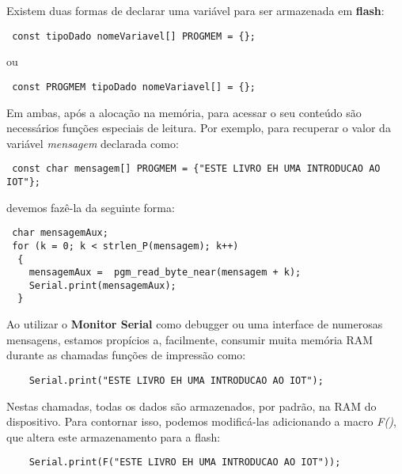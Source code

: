\documentclass[
	11pt,				%
	openright,			%
	twoside,			%
	a5paper,			%
	english,			%
	french,				%
	spanish,			%
	brazil,				%
	sumario=tradicional
]{abntex2}
\begin{document}
\begin{tcolorbox}[colbacktitle=green!50!white!60,
title={\vspace{-13pt}\texttt{[image: notebook.png]} \hspace{2pt} \textsf{\textbf{Na Prática...}\vspace{4pt}}},coltitle=black, colback=white,arc=4mm, outer arc=3.5mm]
\raggedright
 Existem duas formas de declarar uma variável para ser armazenada em \textbf{\textsf{flash}}:
 
 \begin{lstlisting}
 const tipoDado nomeVariavel[] PROGMEM = {};
 \end{lstlisting}
 ou
 \begin{lstlisting}
 const PROGMEM tipoDado nomeVariavel[] = {}; 
 \end{lstlisting}
 
 Em ambas, após a alocação na memória, para acessar o seu conteúdo são necessários funções especiais de leitura. Por exemplo, para recuperar o valor da variável \emph{mensagem} declarada como:
 
 \begin{lstlisting}
 const char mensagem[] PROGMEM = {"ESTE LIVRO EH UMA INTRODUCAO AO IOT"}; 
 \end{lstlisting}
 
 devemos fazê-la da seguinte forma:
 
 \begin{lstlisting}
 char mensagemAux;
 for (k = 0; k < strlen_P(mensagem); k++)
  {
    mensagemAux =  pgm_read_byte_near(mensagem + k);
    Serial.print(mensagemAux);
  }
 \end{lstlisting}
\end{tcolorbox}
    
    Ao utilizar o \textbf{\textsf{Monitor Serial}} como debugger ou uma interface de numerosas mensagens, estamos propícios a, facilmente, consumir muita memória RAM durante as chamadas funções de impressão como:
    \begin{lstlisting}
    Serial.print("ESTE LIVRO EH UMA INTRODUCAO AO IOT"); 
    \end{lstlisting}
    Nestas chamadas, todas os dados são armazenados, por padrão, na RAM do dispositivo. Para contornar isso, podemos modificá-las adicionando a macro \emph{F()}, que altera este armazenamento para a flash:
    \begin{lstlisting}
    Serial.print(F("ESTE LIVRO EH UMA INTRODUCAO AO IOT")); 
    \end{lstlisting}
    
\end{document}
